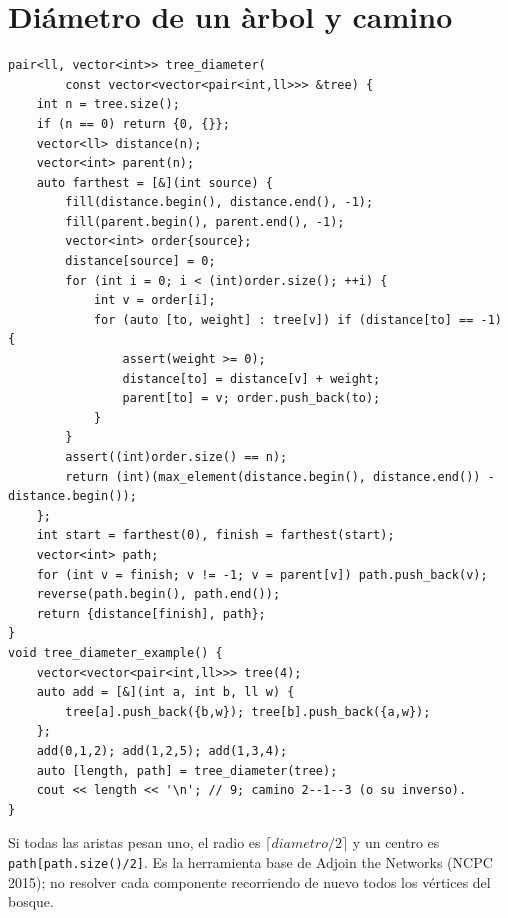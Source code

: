 \section{Di\'ametro de un \`arbol y camino}

\begin{lstlisting}[style=cpp]
pair<ll, vector<int>> tree_diameter(
        const vector<vector<pair<int,ll>>> &tree) {
    int n = tree.size();
    if (n == 0) return {0, {}};
    vector<ll> distance(n);
    vector<int> parent(n);
    auto farthest = [&](int source) {
        fill(distance.begin(), distance.end(), -1);
        fill(parent.begin(), parent.end(), -1);
        vector<int> order{source};
        distance[source] = 0;
        for (int i = 0; i < (int)order.size(); ++i) {
            int v = order[i];
            for (auto [to, weight] : tree[v]) if (distance[to] == -1) {
                assert(weight >= 0);
                distance[to] = distance[v] + weight;
                parent[to] = v; order.push_back(to);
            }
        }
        assert((int)order.size() == n);
        return (int)(max_element(distance.begin(), distance.end()) - distance.begin());
    };
    int start = farthest(0), finish = farthest(start);
    vector<int> path;
    for (int v = finish; v != -1; v = parent[v]) path.push_back(v);
    reverse(path.begin(), path.end());
    return {distance[finish], path};
}
void tree_diameter_example() {
    vector<vector<pair<int,ll>>> tree(4);
    auto add = [&](int a, int b, ll w) {
        tree[a].push_back({b,w}); tree[b].push_back({a,w});
    };
    add(0,1,2); add(1,2,5); add(1,3,4);
    auto [length, path] = tree_diameter(tree);
    cout << length << '\n'; // 9; camino 2--1--3 (o su inverso).
}
\end{lstlisting}

Si todas las aristas pesan uno, el radio es $\lceil diametro/2\rceil$ y un
centro es \texttt{path[path.size()/2]}. Es la herramienta base de
Adjoin the Networks (NCPC 2015); no resolver cada componente recorriendo de
nuevo todos los v\'ertices del bosque.

